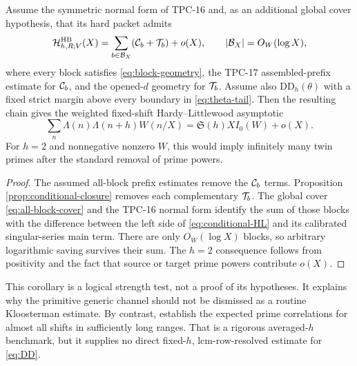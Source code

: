 \begin{corollary}
\label{cor:DD-HL-boundary}
Assume the symmetric normal form of TPC-16 \citep{WangTPC16} and, as an additional global
cover hypothesis, that its hard packet admits
\begin{equation}
 \mathcal H^{\mathrm{HB}}_{h,R;V}(X)
 =\sum_{b\in\mathcal B_X}(\mathcal C_b+\mathcal T_b)+o(X),
 \qquad |\mathcal B_X|=O_W(\log X),
 \label{eq:all-block-cover}
\end{equation}
where every block satisfies \eqref{eq:block-geometry}, the TPC-17
assembled-prefix estimate for $\mathcal C_b$, and the opened-$d$ geometry for
$\mathcal T_b$.  Assume also $\mathrm{DD}_h(\theta)$ with a fixed strict
margin above every boundary in \eqref{eq:theta-tail}.  Then the
resulting chain
gives the weighted fixed-shift Hardy--Littlewood asymptotic
\begin{equation}
 \sum_n\Lambda(n)\Lambda(n+h)W(n/X)
 =\mathfrak S(h)X I_0(W)+o(X).
 \label{eq:conditional-HL}
\end{equation}
For $h=2$ and nonnegative nonzero $W$, this would imply infinitely many
twin primes after the standard removal of prime powers.
\end{corollary}

\begin{proof}
The assumed all-block prefix estimates remove the $\mathcal C_b$ terms.
Proposition \ref{prop:conditional-closure} removes each complementary
$\mathcal T_b$.  The global cover \eqref{eq:all-block-cover} and the TPC-16
normal form identify the sum of those blocks with the difference
between the left side of \eqref{eq:conditional-HL} and its calibrated
singular-series main term.  There are only $O_W(\log X)$ blocks, so
arbitrary logarithmic saving survives their sum.  The $h=2$ consequence
follows from positivity and the fact that source or target prime powers
contribute $o(X)$.
\end{proof}

This corollary is a logical strength test, not a proof of its
hypotheses.  It explains why the primitive generic channel should not
be dismissed as a routine Kloosterman estimate.  By contrast,
\citet{MatomakiRadziwillTao2019} establish the expected prime
correlations for almost all shifts in sufficiently long ranges.  That
is a rigorous averaged-$h$ benchmark, but it supplies no direct
fixed-$h$, lcm-row-resolved estimate for \eqref{eq:DD}.
